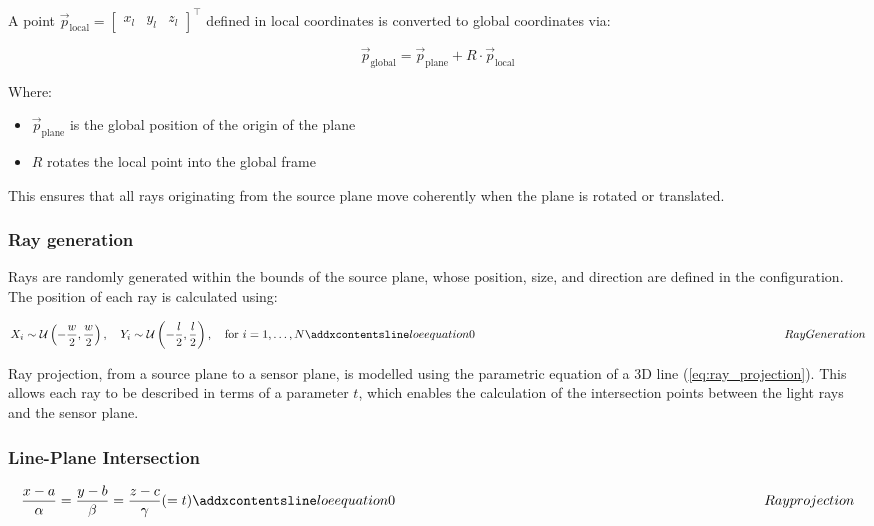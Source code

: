 A point $\vec{p}_\text{local} = \begin{bmatrix} x_l & y_l & z_l \end{bmatrix}^\top$ defined in local coordinates is converted to global coordinates via:

\begin{equation}
\vec{p}_\text{global} = \vec{p}_\text{plane} + R \cdot \vec{p}_\text{local}
\label{eq:local_to_global}
\end{equation}

Where:
\begin{itemize}
    \item $\vec{p}_\text{plane}$ is the global position of the origin of the plane
    \item $R$ rotates the local point into the global frame
\end{itemize}

This ensures that all rays originating from the source plane move coherently when the plane is rotated or translated.

\subsubsection{Ray generation}
Rays are randomly generated within the bounds of the source plane, whose position, size, and direction are defined in the configuration. The position of each ray is calculated using:

\begin{equation}
X_i \sim \mathcal{U}\left(-\frac{w}{2}, \frac{w}{2}\right), \quad
Y_i \sim \mathcal{U}\left(-\frac{l}{2}, \frac{l}{2}\right), \quad
\text{for } i = 1, \ldots, N
\label{eq:RayGeneration}
\addequation{Ray Generation}
\end{equation}

Ray projection, from a source plane to a sensor plane, is modelled using the parametric equation of a 3D line (\ref{eq:ray_projection}). This allows each ray to be described in terms of a parameter $t$, which enables the calculation of the intersection points between the light rays and the sensor plane. 

\subsubsection{Line-Plane Intersection}
\begin{equation}
\frac{x - a}{\alpha} = \frac{y - b}{\beta} = \frac{z - c}{\gamma} (=t)
\label{eq:ray_projection}
\addequation{Ray projection}
\end{equation}

